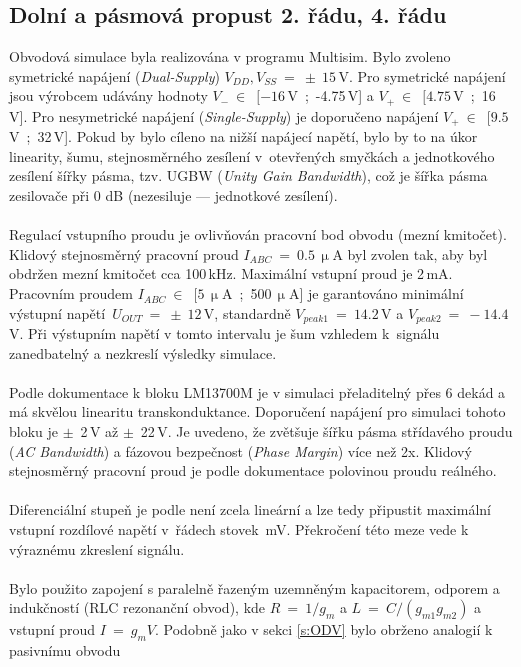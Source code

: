\subsection{Dolní a pásmová propust 2. řádu, 4. řádu}\label{s:DP2}
\noindent Obvodová simulace byla realizována v programu Multisim. Bylo zvoleno symetrické napájení (\textit{Dual-Supply}) $V_{DD},V_{SS}~=~\pm~15$\,V. Pro symetrické napájení jsou výrobcem udávány hodnoty $V_{-}~\in$~$[-16$\,V~;~-4.75\,V] a $V_{+}~\in$~$[4.75$\,V~;~16\,V]. Pro nesymetrické napájení (\textit{Single-Supply}) je doporučeno napájení $V_{+}~\in$~$[9.5$\,V~;~32\,V]. Pokud by bylo cíleno na nižší napájecí napětí, bylo by to na úkor linearity, šumu, stejnosměrného zesílení v~otevřených smyčkách a jednotkového zesílení šířky pásma, tzv. UGBW (\textit{Unity Gain Bandwidth}), což je šířka pásma zesilovače při 0 dB (nezesiluje --- jednotkové zesílení).\\
\\
Regulací vstupního proudu je ovlivňován pracovní bod obvodu (mezní kmitočet). Klidový stejnosměrný pracovní proud $I_{ABC}~=~0.5$\,$\upmu$A byl zvolen tak, aby byl obdržen mezní kmitočet cca 100\,kHz. Maximální vstupní proud je 2\,mA. Pracovním proudem $I_{ABC}~\in$~$[5$\,$\upmu$A~;~500\,$\upmu$A] je garantováno minimální výstupní napětí~$U_{OUT}~=~\pm~12$\,V, standardně $V_{peak 1}~=~14.2$\,V a $V_{peak 2}~=~-14.4$\,V. Při výstupním napětí v tomto intervalu je šum vzhledem k~signálu zanedbatelný a nezkreslí výsledky simulace.\\
\\
\noindent Podle dokumentace k bloku LM13700M je v simulaci přeladitelný přes 6 dekád a má skvělou linearitu transkonduktance. Doporučení napájení pro simulaci tohoto bloku je $\pm$~2\,V až $\pm$~22\,V. Je uvedeno, že zvětšuje šířku pásma střídavého proudu (\textit{AC Bandwidth}) a fázovou bezpečnost (\textit{Phase Margin}) více než 2x. Klidový stejnosměrný pracovní proud je podle dokumentace polovinou proudu reálného.\\
\\
\noindent Diferenciální stupeň je podle není zcela lineární a lze tedy připustit maximální vstupní rozdílové napětí v~řádech stovek~mV. Překročení této meze vede k výraznému zkreslení signálu.\\
\\
\noindent Bylo použito zapojení s paralelně řazeným uzemněným kapacitorem, odporem a indukčností (RLC rezonanční obvod), kde $R~=~1/g_m$ a $L~=~C/(g_{m1}g_{m2})$ a vstupní proud $I~=~g_mV$. Podobně jako v sekci \ref{s:ODV} bylo obrženo analogií k pasivnímu obvodu
